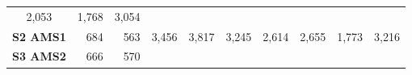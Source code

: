 \documentclass[]{article}
\begin{document}
\begin{longtable}[]{@{}crrrrrrrrr@{}}
\begin{minipage}[t]{0.07\columnwidth}
2,053\strut
\end{minipage} & \begin{minipage}[t]{0.07\columnwidth}\raggedleft\strut
1,768\strut
\end{minipage} & \begin{minipage}[t]{0.07\columnwidth}\raggedleft\strut
3,054\strut
\end{minipage}\tabularnewline
\begin{minipage}[t]{0.14\columnwidth}\centering\strut
\textbf{S2 AMS1}\strut
\end{minipage} & \begin{minipage}[t]{0.06\columnwidth}\raggedleft\strut
684\strut
\end{minipage} & \begin{minipage}[t]{0.06\columnwidth}\raggedleft\strut
563\strut
\end{minipage} & \begin{minipage}[t]{0.07\columnwidth}\raggedleft\strut
3,456\strut
\end{minipage} & \begin{minipage}[t]{0.07\columnwidth}\raggedleft\strut
3,817\strut
\end{minipage} & \begin{minipage}[t]{0.07\columnwidth}\raggedleft\strut
3,245\strut
\end{minipage} & \begin{minipage}[t]{0.07\columnwidth}\raggedleft\strut
2,614\strut
\end{minipage} & \begin{minipage}[t]{0.07\columnwidth}\raggedleft\strut
2,655\strut
\end{minipage} & \begin{minipage}[t]{0.07\columnwidth}\raggedleft\strut
1,773\strut
\end{minipage} & \begin{minipage}[t]{0.07\columnwidth}\raggedleft\strut
3,216\strut
\end{minipage}\tabularnewline
\begin{minipage}[t]{0.14\columnwidth}\centering\strut
\textbf{S3 AMS2}\strut
\end{minipage} & \begin{minipage}[t]{0.06\columnwidth}\raggedleft\strut
666\strut
\end{minipage} & \begin{minipage}[t]{0.06\columnwidth}\raggedleft\strut
570\strut
\end{minipage} & \begin{minipage}[t]{0.07\columnwidth}\raggedleft\strut

\end{minipage}
\end{longtable}
\end{document}
